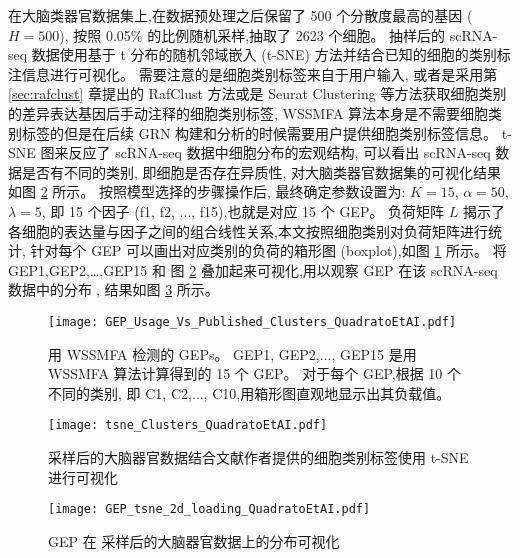 在大脑类器官数据集上,在数据预处理之后保留了 500 个分散度最高的基因 ($H = 500$),
按照 0.05\% 的比例随机采样,抽取了 2623 个细胞。
抽样后的 scRNA-seq 数据使用基于 t 分布的随机邻域嵌入 (t-SNE) 方法并结合已知的细胞的类别标注信息进行可视化。
需要注意的是细胞类别标签来自于用户输入,
或者是采用第 \ref{sec:rafclust} 章提出的 RafClust 方法或是 Seurat Clustering 等方法获取细胞类别的差异表达基因后手动注释的细胞类别标签, 
WSSMFA 算法本身是不需要细胞类别标签的但是在后续 GRN 构建和分析的时候需要用户提供细胞类别标签信息。
t-SNE 图来反应了 scRNA-seq 数据中细胞分布的宏观结构,
可以看出 scRNA-seq 数据是否有不同的类别,
即细胞是否存在异质性,
对大脑类器官数据集的可视化结果如图 \ref{fig:gep-tsne} 所示。
按照模型选择的步骤操作后,
最终确定参数设置为: $K = 15$, $\alpha = 50$, $\lambda = 5$, 
即 15 个因子 (f1, f2, $\ldots$, f15),也就是对应 15 个 GEP。
负荷矩阵 $L$ 揭示了各细胞的表达量与因子之间的组合线性关系,本文按照细胞类别对负荷矩阵进行统计,
针对每个 GEP 可以画出对应类别的负荷的箱形图 (boxplot),如图 \ref{fig:gep-gep} 所示。
将 GEP1,GEP2,\ldots,GEP15 和 图 \ref{fig:gep-tsne} 叠加起来可视化,用以观察 GEP 在该 scRNA-seq 数据中的分布,
结果如图 \ref{fig:gep-distribution} 所示。

\begin{figure}[!htbp]
    \centering
    \texttt{[image: GEP\_Usage\_Vs\_Published\_Clusters\_QuadratoEtAI.pdf]}
    \caption{
    用 WSSMFA 检测的 GEPs。
    GEP1, GEP2,$\ldots$, GEP15 是用 WSSMFA 算法计算得到的 15 个 GEP。
    对于每个 GEP,根据 10 个不同的类别,
    即 C1, C2,$\ldots$, C10,用箱形图直观地显示出其负载值。 
    }
    \label{fig:gep-gep}
\end{figure}

\begin{figure}[!htbp]
    \centering
    \texttt{[image: tsne\_Clusters\_QuadratoEtAI.pdf]}
    \caption{
    采样后的大脑器官数据结合文献作者提供的细胞类别标签使用 t-SNE 进行可视化
    }
    \label{fig:gep-tsne}
\end{figure}

\begin{figure}[!htbp]
    \centering
    \texttt{[image: GEP\_tsne\_2d\_loading\_QuadratoEtAI.pdf]}
    \caption{
    GEP 在 采样后的大脑器官数据上的分布可视化
    }
    \label{fig:gep-distribution}
\end{figure}

